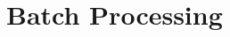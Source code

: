 \documentclass[../Maxima_Workbook.tex]{subfiles}
\begin{document}
	
\chapter{Batch Processing}
\end{document}
